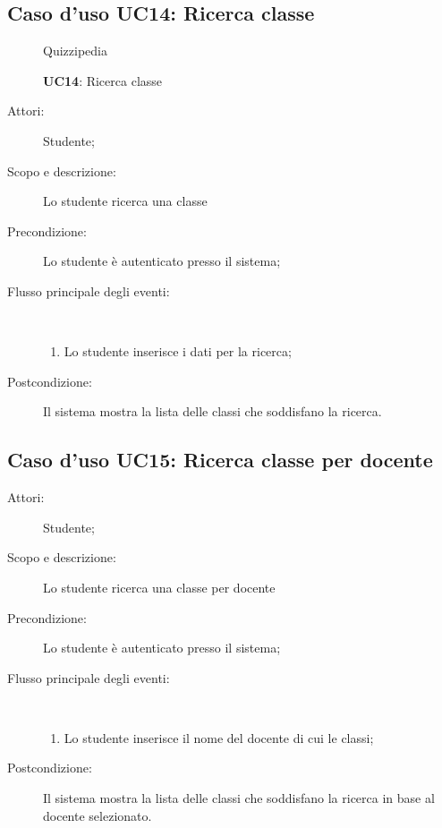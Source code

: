 \subsection{Caso d'uso UC14: Ricerca classe}
\begin{figure}[H]
	\centering
	\begin{resizedtikzpicture}{\textwidth}
		\begin{umlsystem}[x=0, fill=lightgray!20]{Quizzipedia}
		\end{umlsystem}
	\end{resizedtikzpicture}
	\caption{\textbf{UC14}: Ricerca classe}
	\label{UC14}
\end{figure}
\begin{description}
	\item[Attori:] Studente;
	\item[Scopo e descrizione:] Lo studente ricerca una classe
	\item[Precondizione:] Lo studente è autenticato presso il sistema;
	
	\item[Flusso principale degli eventi:] \ 
	\begin{enumerate}
		\item Lo studente inserisce i dati per la ricerca;
		
	\end{enumerate}
	\item[Postcondizione:] Il sistema mostra la lista delle classi che soddisfano la ricerca.
\end{description}
\hypertarget{UC15}{}
\subsection{Caso d'uso UC15: Ricerca classe per docente}\begin{description}
	\item[Attori:] Studente;
	\item[Scopo e descrizione:] Lo studente ricerca una classe per docente
	\item[Precondizione:] Lo studente è autenticato presso il sistema;
	
	\item[Flusso principale degli eventi:] \ 
	\begin{enumerate}
		\item Lo studente inserisce il nome del docente di cui le classi;
		
	\end{enumerate}
	\item[Postcondizione:] Il sistema mostra la lista delle classi che soddisfano la ricerca in base al docente selezionato.
\end{description}
\hypertarget{UC16}{}
